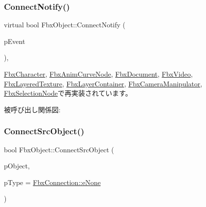 \subsubsection{\texorpdfstring{Connect\+Notify()}{ConnectNotify()}}
{\footnotesize\ttfamily virtual bool Fbx\+Object\+::\+Connect\+Notify (\begin{DoxyParamCaption}\item[{const \hyperlink{class_fbx_connect_event}{Fbx\+Connect\+Event} \&}]{p\+Event }\end{DoxyParamCaption})\hspace{0.3cm}{\ttfamily [protected]}, {\ttfamily [virtual]}}



\hyperlink{class_fbx_character_a42e5f6d72c0669b6eedf0cb511720845}{Fbx\+Character}, \hyperlink{class_fbx_anim_curve_node_a0a3743b600796ab2b87dea299654b98c}{Fbx\+Anim\+Curve\+Node}, \hyperlink{class_fbx_document_a7c3b910b2d44729973266e32733da3fb}{Fbx\+Document}, \hyperlink{class_fbx_video_afb1d8565917f33ab3777ac9e07b21cd0}{Fbx\+Video}, \hyperlink{class_fbx_layered_texture_a78ed9cd6298697060ebc278617d72d44}{Fbx\+Layered\+Texture}, \hyperlink{class_fbx_layer_container_a7fe50204f62a2d4db056cc730c1eba18}{Fbx\+Layer\+Container}, \hyperlink{class_fbx_camera_manipulator_a0cd75ec4a78ef84f2cf10f750e4491c6}{Fbx\+Camera\+Manipulator}, \hyperlink{class_fbx_selection_node_acf8e30df7df84c4fbff9c12f64a2b3fe}{Fbx\+Selection\+Node}で再実装されています。

被呼び出し関係図\+:
\mbox{\label{class_fbx_object_a1c75d466c5166486787bfa06b4fd221f}} 
\subsubsection{\texorpdfstring{Connect\+Src\+Object()}{ConnectSrcObject()}}
{\footnotesize\ttfamily bool Fbx\+Object\+::\+Connect\+Src\+Object (\begin{DoxyParamCaption}\item[{\hyperlink{class_fbx_object}{Fbx\+Object} $\ast$}]{p\+Object,  }\item[{\hyperlink{class_fbx_connection_a3df448a5db356652ab99fd2be2553749}{Fbx\+Connection\+::\+E\+Type}}]{p\+Type = {\ttfamily \hyperlink{class_fbx_connection_a3df448a5db356652ab99fd2be2553749a47aa04870c3c0769263e3972e67e9ebe}{Fbx\+Connection\+::e\+None}} }\end{DoxyParamCaption})}

